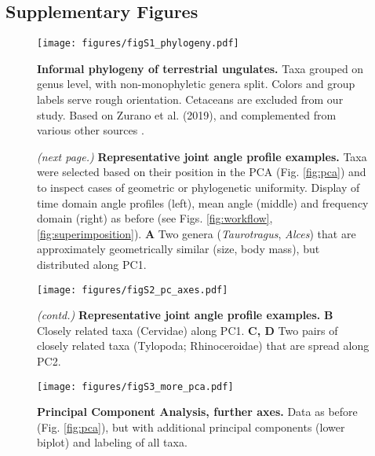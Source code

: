 \newpage
\subsection{Supplementary Figures}

\begin{figure}[h!]
\centering
\texttt{[image: figures/figS1\_phylogeny.pdf]}
\caption{\textbf{Informal phylogeny of terrestrial ungulates.} Taxa grouped on genus level, with non-monophyletic genera split. Colors and group labels serve rough orientation. Cetaceans are excluded from our study.
Based on Zurano et al. (2019), and complemented from various other sources \citep{Zurano2019,ParisiDutra2017,Frantz2015,Ryder2011,Price2009,Gongora2011,Funk2007,Hassanin2012}.
 }
\label{fig:phylogeny}
\end{figure}


\begin{figure} [b!]
  \caption{
\textit{(next page.)}
\textbf{Representative joint angle profile examples.}
Taxa were selected based on their position in the PCA (Fig. \ref*{fig:pca}) and to inspect cases of geometric or phylogenetic uniformity.
Display of time domain  angle profiles (left), mean  angle (middle) and frequency domain (right) as before (see Figs. \ref*{fig:workflow}, \ref*{fig:superimposition}).
\textbf{A} Two genera (\textit{Taurotragus}, \textit{Alces}) that are approximately geometrically similar (size, body mass), but distributed along PC1. %
  }
\end{figure}
\addtocounter{figure}{-1}

\clearpage
\begin{figure}[pt]
\centering
\texttt{[image: figures/figS2\_pc\_axes.pdf]}
\caption[Representative Examples]{
\textit{(contd.)}
\textbf{Representative joint angle profile examples.}
\textbf{B} Closely related taxa (Cervidae) along PC1.
\textbf{C, D} Two pairs of closely related taxa (Tylopoda; Rhinoceroidae) that are spread along PC2.
 }
\label{fig:examples}
\end{figure}

\clearpage
\begin{figure}[pt]
\centering
\texttt{[image: figures/figS3\_more\_pca.pdf]}
\caption[Further PC Axes]{\textbf{Principal Component Analysis, further axes.} Data as before (Fig. \ref*{fig:pca}), but with additional principal components (lower biplot) and labeling of all taxa.
 }
\label{fig:more_pca}
\end{figure}



